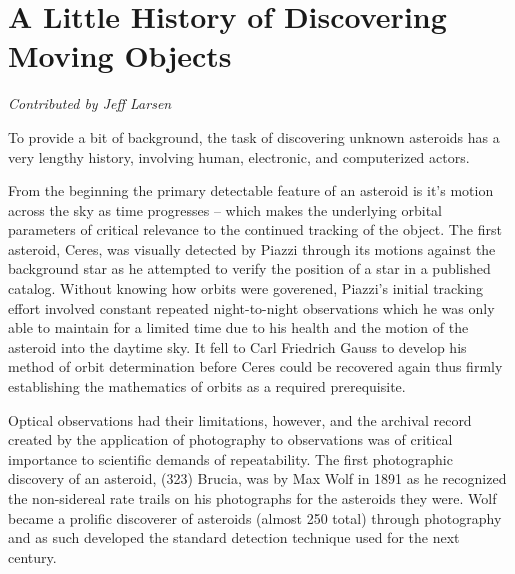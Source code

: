 \appendix
\section{A Little History of Discovering Moving Objects}
\label{history}

{\it Contributed by Jeff Larsen}

To provide a bit of background, the task of discovering unknown asteroids has a very
lengthy history, involving human, electronic, and computerized actors.

From the beginning the primary detectable feature of an asteroid is
it's motion across the sky as time progresses -- which makes the
underlying orbital parameters of critical relevance to the continued
tracking of the object.  The first asteroid, Ceres, was visually
detected by Piazzi \citep{1802QB378} through its motions
against the background star as he attempted to verify the position of
a star in a published catalog.  Without knowing how orbits were
goverened, Piazzi's initial tracking effort involved constant repeated
night-to-night observations which he was only able to maintain for a
limited time due to his health and the motion of the asteroid into the
daytime sky.  It fell to Carl Friedrich Gauss to develop his method of
orbit determination before Ceres could be recovered again thus firmly
establishing the mathematics of orbits as a required prerequisite.

Optical observations had their limitations, however, and the archival
record created by the application of photography to observations was
of critical importance to scientific demands of repeatability.  The
first photographic discovery of an asteroid, (323) Brucia, was by Max
Wolf in 1891 \citep{1892AN} as he recognized the
non-sidereal rate trails on his photographs for the asteroids they
were.  Wolf became a prolific discoverer of asteroids (almost 250
total) through photography and as such developed the standard
detection technique used for the next century.

